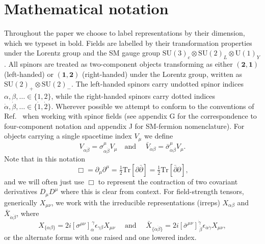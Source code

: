 
\chapter{Mathematical notation}
\label{chapter:notation}

Throughout the paper we choose to label representations by their dimension,
which we typeset in bold. Fields are labelled by their transformation properties
under the Lorentz group and the SM gauge group $\mathrm{SU}(3)_{c} \otimes
\mathrm{SU}(2)_{L} \otimes \mathrm{U}(1)_{Y}$. All spinors are treated as
two-component objects transforming as either $(\mathbf{2}, \mathbf{1})$
(left-handed) or $(\mathbf{1}, \mathbf{2})$ (right-handed) under the Lorentz
group, written as $\mathrm{SU}(2)_{+} \otimes \mathrm{SU}(2)_{-}$. The
left-handed spinors carry undotted spinor indices $\alpha, \beta, \ldots \in
\{1, 2\}$, while the right-handed spinors carry dotted indices $\dot{\alpha},
\dot{\beta}, \ldots \in \{\dot{1}, \dot{2}\}$. Wherever possible we attempt to
conform to the conventions of Ref.~\cite{Dreiner:2008tw} when working with
spinor fields (see appendix G for the correspondence to four-component notation
and appendix J for SM-fermion nomenclature). For objects carrying a single
spacetime index $V_\mu$ we define
\begin{equation}
  V_{\alpha \dot{\beta}} = \sigma^\mu_{\alpha \dot{\beta}} V_\mu \quad \text{
    and
  } \quad \bar{V}_{\dot{\alpha}\beta } = \bar{\sigma}^\mu_{\dot{\alpha}\beta} V_{\mu}.
\end{equation}
Note that in this notation
\begin{equation}
  \Box = \partial_{\mu} \partial^{\mu} = \tfrac{1}{2}\text{Tr}[\partial \bar{\partial}] = \tfrac{1}{2}\text{Tr}[\bar{\partial} \partial],
\end{equation}
and we will often just use $\Box$ to represent the contraction of two covariant
derivatives $D_{\mu}D^{\mu}$ where this is clear from context. For
field-strength tensors, generically $X_{\mu\nu}$, we work with the irreducible
representations (irreps) $X_{\alpha \beta}$ and
$\bar{X}_{\dot{\alpha} \dot{\beta}}$, where
\begin{equation}
  X_{\{\alpha \beta\}} = 2i [\sigma^{\mu \nu}]^{~\gamma}_\alpha \epsilon_{\gamma \beta} X_{\mu \nu} \quad \text{ and } \quad
  \bar{X}_{\{\dot{\alpha} \dot{\beta}\}} = 2i [\bar{\sigma}^{\mu \nu}]^{\dot{\gamma}}_{~\dot{\beta}} \epsilon_{\dot{\alpha} \dot{\gamma}} X_{\mu \nu},
\end{equation}
or the alternate forms with one raised and one lowered index.


